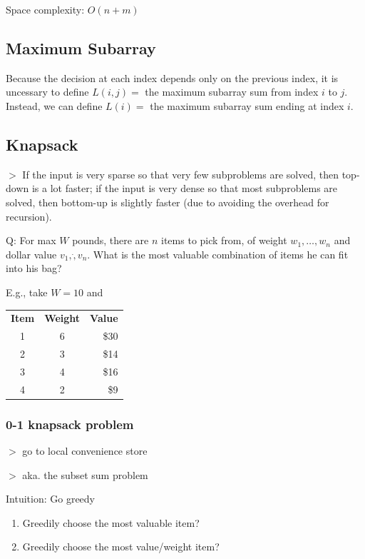 \documentclass[12pt,a4paper]{article}
\newcommand{\remark}[1]{
    {\small $>$ {\color{blue} #1}}
}
\begin{document}
Space complexity: $O(n + m)$

\subsection*{Maximum Subarray}

Because the decision at each index depends only on the previous index,
it is uncessary to define $L(i, j) = $ the maximum subarray sum from index $i$ to $j$.
Instead, we can define $L(i) = $ the maximum subarray sum ending at index $i$.

\subsection*{Knapsack}

\remark{If the input is very sparse so that very few subproblems are solved, then top-down is a lot faster; if the input is very dense so that most subproblems are solved, then bottom-up is slightly faster (due to avoiding the overhead for recursion).}

Q: For max $W$ pounds, there are $n$ items to pick from, of weight $w_1, \dots, w_n$ and dollar value $v_1, \dot, v_n$. 
What is the most valuable combination of items he can fit into his bag?

E.g., take $W = 10$ and 

\begin{table}[h]
    \centering
    \begin{tabular}{c c r}
        \textbf{Item} & \textbf{Weight} & \textbf{Value} \\
        1 & 6 & \$30 \\
        2 & 3 & \$14 \\
        3 & 4 & \$16 \\
        4 & 2 & \$9 \\
    \end{tabular}
\end{table}

\subsubsection*{0-1 knapsack problem}

\remark{go to local convenience store}

\remark{aka. the subset sum problem}

Intuition: Go greedy

\begin{enumerate}
  \item Greedily choose the most valuable item?
  \item Greedily choose the most value/weight item?
\end{enumerate}
\end{document}
